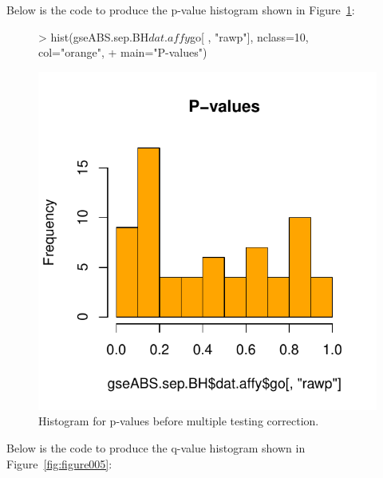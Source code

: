 \documentclass[11pt]{article}
\renewenvironment{Schunk}{\vspace{\topsep}}{\vspace{\topsep}}
\begin{document}
\newpage
Below is the code to produce the p-value histogram
shown in Figure~\ref{fig:figure004}:

\begin{figure}[htbp]
\begin{center}
\begin{Schunk}
\begin{Sinput}
> hist(gseABS.sep.BH$dat.affy$go[ , "rawp"], nclass=10, col="orange",
+      main="P-values")
\end{Sinput}
\end{Schunk}
\includegraphics{Figures/plots-figure004}
\caption[\small P-value histogram]{\small
Histogram for p-values before multiple testing correction.
}
\label{fig:figure004}
\end{center}
\end{figure}

\newpage
Below is the code to produce the q-value histogram
shown in Figure~\ref{fig:figure005}:
\end{document}

